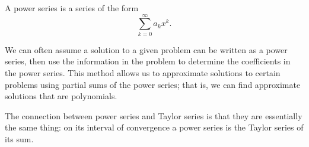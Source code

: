 \begin{summary}
\item A power series is a series of the form
\[\sum_{k=0}^{\infty} a_kx^k.\]
\item We can often assume a solution to a given problem can be written as a power series, then use the information in the problem to determine the coefficients in the power series. This method allows us to approximate solutions to certain problems using partial sums of the power series; that is, we can find approximate solutions that are polynomials.
\item The connection between power series and Taylor series is that they are essentially the same thing: on its interval of convergence a power series is the Taylor series of its sum.
\end{summary}

\nin \hrulefill

\newpage



\clearpage
